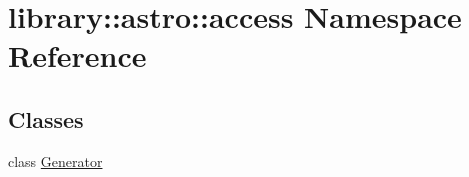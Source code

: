 \hypertarget{namespacelibrary_1_1astro_1_1access}{}\section{library\+:\+:astro\+:\+:access Namespace Reference}
\label{namespacelibrary_1_1astro_1_1access}
\subsection*{Classes}
\begin{DoxyCompactItemize}
\item 
class \hyperlink{classlibrary_1_1astro_1_1access_1_1_generator}{Generator}
\end{DoxyCompactItemize}
